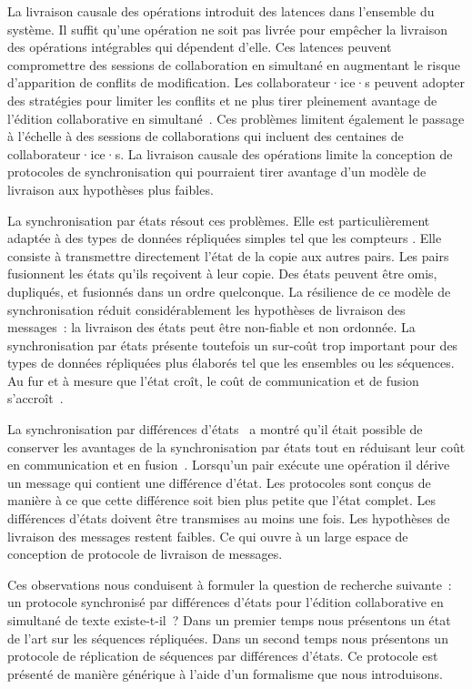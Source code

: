 La livraison causale des opérations introduit des latences dans l'ensemble du système.
Il suffit qu'une opération ne soit pas livrée pour empêcher la livraison des opérations intégrables qui dépendent d'elle.
Ces latences peuvent compromettre des sessions de collaboration en simultané en augmentant le risque d'apparition de conflits de modification.
Les collaborateur·ice·s peuvent adopter des stratégies pour limiter les conflits et ne plus tirer pleinement avantage de l'édition collaborative en simultané~\autocite{ignat2014_delayeffect}.
Ces problèmes limitent également le passage à l'échelle à des sessions de collaborations qui incluent des centaines de collaborateur·ice·s.
La livraison causale des opérations limite la conception de protocoles de synchronisation qui pourraient tirer avantage d'un modèle de livraison aux hypothèses plus faibles.

La synchronisation par états résout ces problèmes.
Elle est particulièrement adaptée à des types de données répliquées simples tel que les compteurs \autocite{almeida_2018_delta-crdt-revisited}.
Elle consiste à transmettre directement l'état de la copie aux autres pairs.
Les pairs fusionnent les états qu'ils reçoivent à leur copie.
Des états peuvent être omis, dupliqués, et fusionnés dans un ordre quelconque.
La résilience de ce modèle de synchronisation réduit considérablement les hypothèses de livraison des messages~: la livraison des états peut être non-fiable et non ordonnée.
La synchronisation par états présente toutefois un sur-coût trop important pour des types de données répliquées plus élaborés tel que les ensembles ou les séquences.
Au fur et à mesure que l'état croît, le coût de communication et de fusion s'accroît~\autocite{enes_2018_efficient-sync-state-based-crdt}.

La synchronisation par différences d'états~\autocite{almeida_2018_delta-crdt-revisited} a montré qu'il était possible de conserver les avantages de la synchronisation par états tout en réduisant leur coût en communication et en fusion~\autocite{enes_2018_efficient-sync-state-based-crdt}.
Lorsqu'un pair exécute une opération il dérive un message qui contient une différence d'état.
Les protocoles sont conçus de manière à ce que cette différence soit bien plus petite que l'état complet.
Les différences d'états doivent être transmises au moins une fois.
Les hypothèses de livraison des messages restent faibles.
Ce qui ouvre à un large espace de conception de protocole de livraison de messages.

Ces observations nous conduisent à formuler la question de recherche suivante~: un protocole synchronisé par différences d'états pour l'édition collaborative en simultané de texte existe-t-il~?
Dans un premier temps nous présentons un état de l'art sur les séquences répliquées.
Dans un second temps nous présentons un protocole de réplication de séquences par différences d'états.
Ce protocole est présenté de manière générique à l'aide d'un formalisme que nous introduisons.


